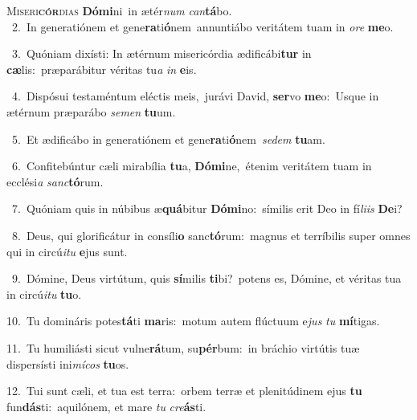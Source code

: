 \lettrine{\initial\textcolor{\initialcolor}{M}}{iseri\-\textbf{cór}\-dias} \textbf{Dó}\-\textbf{mi}ni~\star in ætér\textit{num} \textit{can}\-\textbf{tá}bo.\\
{\numbfont\textcolor{\numbcolor}{~2.}}~In generatiónem et gene\-\textbf{ra}\-ti\-\textbf{ó}\-nem~\star annuntiábo veritátem tuam in \textit{o}\-\textit{re} \textbf{me}\-o.\par
{\numbfont\textcolor{\numbcolor}{~3.}}~Quóniam dixísti: In ætérnum misericórdia ædificábi\textbf{tur} in \textbf{cæ}\-lis:~\star præparábitur véritas tu\textit{a} \textit{in} \textbf{e}\-is.\par
{\numbfont\textcolor{\numbcolor}{~4.}}~Dispósui testaméntum eléctis meis,~\dagger jurávi David, \textbf{ser}\-vo \textbf{me}\-o:~\star Usque in ætérnum præparábo \textit{se}\-\textit{men} \textbf{tu}\-um.\par
{\numbfont\textcolor{\numbcolor}{~5.}}~Et ædificábo in generatiónem et gene\-\textbf{ra}\-ti\-\textbf{ó}\-nem~\star \textit{se}\-\textit{dem} \textbf{tu}\-am.\par
{\numbfont\textcolor{\numbcolor}{~6.}}~Confitebúntur cæli mirabília \textbf{tu}\-a, \textbf{Dó}\-\textbf{mi}ne,~\star étenim veritátem tuam in ecclési\textit{a} \textit{sanc}\-\textbf{tó}rum.\par
{\numbfont\textcolor{\numbcolor}{~7.}}~Quóniam quis in núbibus æ\-\textbf{quá}\-bitur \textbf{Dó}\-\textbf{mi}no:~\star símilis erit Deo in fí\-\textit{li}\-\textit{is} \textbf{De}\-i?\par
{\numbfont\textcolor{\numbcolor}{~8.}}~Deus, qui glorificátur in consíli\textbf{o} sanc\-\textbf{tó}\-rum:~\star magnus et terríbilis super omnes qui in circú\-\textit{i}\-\textit{tu} \textbf{e}\-jus sunt.\par
{\numbfont\textcolor{\numbcolor}{~9.}}~Dómine, Deus virtútum, quis \textbf{sí}\-milis \textbf{ti}\-bi?~\star potens es, Dómine, et véritas tua in circú\-\textit{i}\-\textit{tu} \textbf{tu}\-o.\par
{\numbfont\textcolor{\numbcolor}{10.}}~Tu domináris potes\-\textbf{tá}\-ti \textbf{ma}\-ris:~\star motum autem flúctuum e\textit{jus} \textit{tu} \textbf{mí}\-tigas.\par
{\numbfont\textcolor{\numbcolor}{11.}}~Tu humiliásti sicut vulne\-\textbf{rá}\-tum, su\-\textbf{pér}\-bum:~\star in bráchio virtútis tuæ dispersísti ini\-\textit{mí}\-\textit{cos} \textbf{tu}\-os.\par
{\numbfont\textcolor{\numbcolor}{12.}}~Tui sunt cæli, et tua est terra:~\dagger orbem terræ et plenitúdinem ejus \textbf{tu} fun\-\textbf{dás}\-ti:~\star aquilónem, et mare \textit{tu} \textit{cre}\-\textbf{ás}ti.\par
